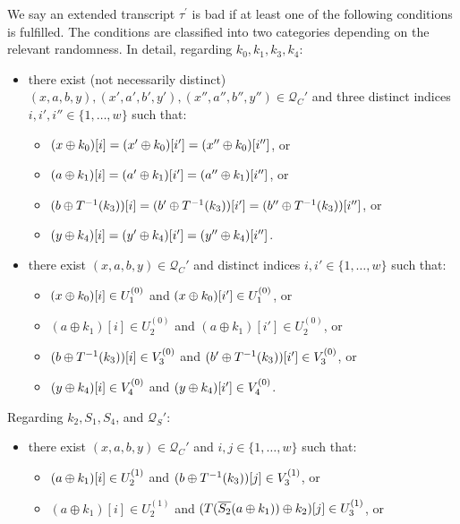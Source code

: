 \begin{definition}
\label{defn:bad-tau-4-rounds}

We say an extended transcript $\tau^{\prime}$ is bad if at least one of the following conditions is fulfilled. The conditions are classified into two categories depending on the relevant randomness. In detail, regarding $k_0,k_1,k_3,k_4$:
\begin{itemize}[leftmargin=10mm]
	\item[\bone] there exist (not necessarily distinct) $(x,a,b,y),(x',a',b',y'),(x'',a'',b'',y'')\in \mathcal{Q}_{C}'$ and three distinct indices $i, i', i'' \in \{1, \ldots, w\}$ such that:
	\begin{itemize}
		\item $(x\oplus k_0)[i]=(x'\oplus k_0)[i']=(x''\oplus k_0)[i'']$, or
		\item $(a\oplus k_1)[i]=(a'\oplus k_1)[i']=(a''\oplus k_1)[i'']$, or
		\item $(b\oplus T^{-1}(k_3))[i]=(b'\oplus T^{-1}(k_3))[i']=(b''\oplus T^{-1}(k_3))[i'']$, or
		\item $(y\oplus k_4)[i]=(y'\oplus k_4)[i']=(y''\oplus k_4)[i'']$.
	\end{itemize}
	\item[\btwo] there exist $(x,a,b,y) \in \mathcal{Q}_{C}'$ and distinct indices $i, i' \in \{1, \ldots, w\}$ such that:
	\begin{itemize}
		\item $(x\oplus k_0)[i]\in U_1^{(0)}$ and $(x\oplus k_0)[i']\in U_1^{(0)}$, or
		\item $(a \oplus k_1)[i]\in U_{2}^{(0)}$ and $(a \oplus k_1)[i']\in U_{2}^{(0)}$, or
		\item $(b\oplus T^{-1}(k_3))[i]\in V_3^{(0)}$ and
		$(b'\oplus T^{-1}(k_3))[i']\in V_3^{(0)}$, or
		\item $(y\oplus k_4)[i]\in V_4^{(0)}$ and $(y\oplus k_4)[i']\in V_4^{(0)}$.
	\end{itemize}
\end{itemize}
%
%
Regarding $k_2,S_1,S_4$, and $\mathcal{Q}_S'$:
%
%
\begin{itemize}[leftmargin=10mm]
	\item[\bthree] there exist $(x,a,b,y) \in \mathcal{Q}_{C}'$ and $i, j\in\{1, \ldots, w\}$ such that:
	\begin{itemize}
		\item $(a\oplus k_1)[i]\in U_2^{(1)}$ and $(b\oplus T^{-1}(k_3))[j]\in V_3^{(1)}$, or
		\item $(a \oplus k_1)[i]\in U_{2}^{(1)}$ and $(T(\overline{S_2}(a \oplus k_1))\oplus k_2)[j]\in U_{3}^{(1)}$, or

\end{itemize}
\end{itemize}
\end{definition}
